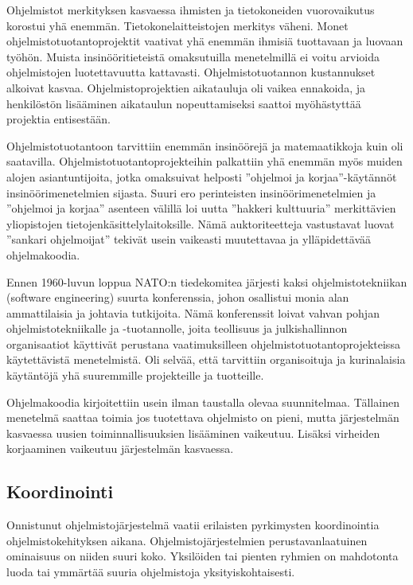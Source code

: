 \documentclass[finnish]{tktltiki2}
\theoremstyle{definition}
\theoremstyle{remark}
\begin{document}
Ohjelmistot merkityksen kasvaessa ihmisten ja tietokoneiden vuorovaikutus korostui yhä enemmän. Tietokonelaitteistojen merkitys väheni. Monet ohjelmistotuotantoprojektit vaativat yhä enemmän ihmisiä tuottavaan ja luovaan työhön. Muista insinööritieteistä omaksutuilla menetelmillä ei voitu arvioida ohjelmistojen luotettavuutta kattavasti. Ohjelmistotuotannon kustannukset alkoivat kasvaa. Ohjelmistoprojektien aikatauluja oli vaikea ennakoida, ja henkilöstön lisääminen aikataulun nopeuttamiseksi saattoi myöhästyttää projektia entisestään\cite{BOE06}.

Ohjelmistotuotantoon tarvittiin enemmän insinöörejä ja matemaatikkoja kuin oli saatavilla. Ohjelmistotuotantoprojekteihin palkattiin yhä enemmän myös muiden alojen asiantuntijoita, jotka omaksuivat helposti ''ohjelmoi ja korjaa''-käytännöt insinöörimenetelmien sijasta. Suuri ero perinteisten insinöörimenetelmien ja ''ohjelmoi ja korjaa'' asenteen välillä loi uutta ''hakkeri kulttuuria'' merkittävien yliopistojen tietojenkäsittelylaitoksille. Nämä auktoriteetteja vastustavat luovat ''sankari ohjelmoijat'' tekivät usein vaikeasti muutettavaa ja ylläpidettävää ohjelmakoodia\cite{BOE06}.

Ennen 1960-luvun loppua NATO:n tiedekomitea järjesti kaksi ohjelmistotekniikan (software engineering) suurta konferenssia, johon osallistui monia alan ammattilaisia ja johtavia tutkijoita. Nämä konferenssit loivat vahvan pohjan ohjelmistotekniikalle ja -tuotannolle, joita teollisuus ja julkishallinnon organisaatiot käyttivät perustana vaatimuksilleen ohjelmistotuotantoprojekteissa käytettävistä menetelmistä. Oli selvää, että tarvit\-tiin organisoituja ja kurinalaisia käytäntöjä yhä suuremmille projekteille ja tuotteille\cite{BOE06}.

Ohjelmakoodia kirjoitettiin usein ilman taustalla olevaa suunnitelmaa. Tällainen menetelmä saattaa toimia jos tuotettava ohjelmisto on pieni, mutta järjestelmän kasvaessa uusien toiminnallisuuksien lisääminen vaikeutuu. Lisäksi virheiden korjaaminen vaikeutuu järjestelmän kasvaessa\cite{FOW01a}.

\subsection{Koordinointi}

Onnistunut ohjelmistojärjestelmä vaatii erilaisten pyrkimysten koordinointia ohjelmistokehityksen aikana. Ohjelmistojärjestelmien perustavanlaatuinen ominaisuus on niiden suuri koko. Yksilöiden tai pienten ryhmien on mahdotonta luoda tai ymmärtää suuria ohjelmistoja yksityiskohtaisesti\cite{KES95}.
\end{document}
